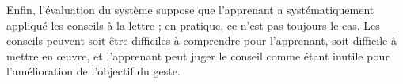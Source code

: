 Enfin, l'évaluation du système suppose que l'apprenant a systématiquement appliqué les conseils à la lettre ; en pratique, ce n'est pas toujours le cas. Les conseils peuvent soit être difficiles à comprendre pour l'apprenant, soit difficile à mettre en œuvre, et l'apprenant peut juger le conseil comme étant inutile pour l'amélioration de l'objectif du geste.



